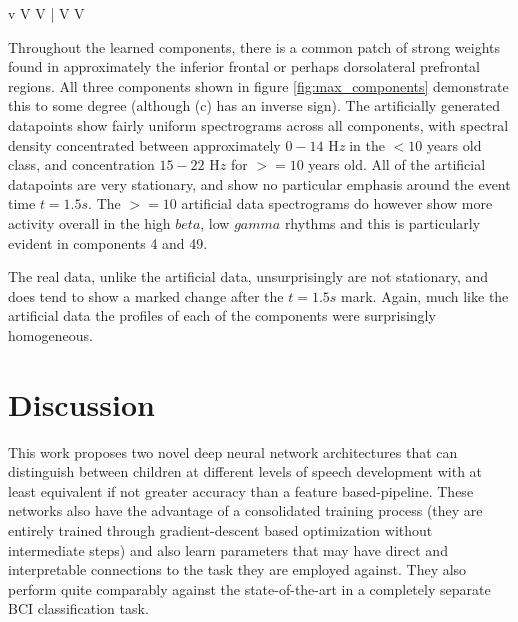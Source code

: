 \documentclass[fleqn,10pt]{wlscirep}
\begin{document}
\begin{table}[t]
\begin{tabular}{v  V V | V V}
                
 \end{tabular}
 \label{tab:max_spectrograms}
\end{table}

Throughout the learned components, there is a common patch of strong weights found in approximately the inferior frontal or perhaps dorsolateral prefrontal regions. All three components shown in figure \ref{fig:max_components} demonstrate this to some degree (although (c) has an inverse sign). The artificially generated datapoints show fairly uniform spectrograms across all components, with spectral density concentrated between approximately $0-14$ H{\em z} in the $<10$ years old class, and concentration $15-22$ H$z$ for $>=10$ years old. All of the artificial datapoints are very stationary, and show no particular emphasis around the event time $t=1.5s$. The $>=10$ artificial data spectrograms do however show more activity overall in the high $beta$, low $gamma$ rhythms and this is particularly evident in components 4 and 49.

The real data, unlike the artificial data, unsurprisingly are not stationary, and does tend to show a marked change after the $t=1.5s$ mark. Again, much like the artificial data the profiles of each of the components were surprisingly homogeneous.

\section*{Discussion}

This work proposes two novel deep neural network architectures that can distinguish between children at different levels of speech development with at least equivalent if not greater accuracy than a feature based-pipeline. These networks also have the advantage of a consolidated training process (they are entirely trained through gradient-descent based optimization without intermediate steps) and also learn parameters that may have direct and interpretable connections to the task they are employed against. They also perform quite comparably against the state-of-the-art in a completely separate BCI classification task. 

\end{document}

